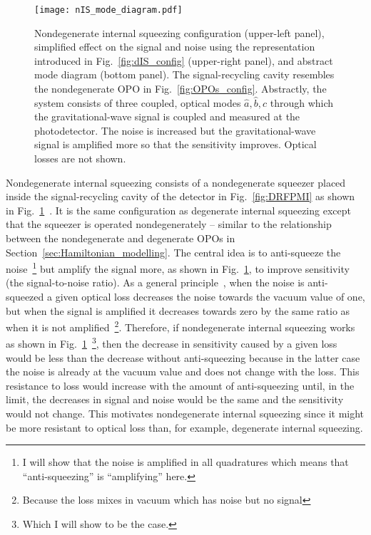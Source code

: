 \begin{figure}[htp]
    \centering
    \texttt{[image: nIS\_mode\_diagram.pdf]}
    \caption{Nondegenerate internal squeezing configuration (upper-left panel), simplified effect on the signal and noise using the representation introduced in Fig.~\ref{fig:dIS_config} (upper-right panel), and abstract mode diagram (bottom panel). The signal-recycling cavity resembles the nondegenerate OPO in Fig.~\ref{fig:OPOs_config}. Abstractly, the system consists of three coupled, optical modes $\hat a,\hat b,\hat c$ through which the gravitational-wave signal is coupled and measured at the photodetector. The noise is increased but the gravitational-wave signal is amplified more so that the sensitivity improves. Optical losses are not shown.}
    \label{fig:nIS_mode_diagram}
\end{figure}

Nondegenerate internal squeezing consists of a nondegenerate squeezer placed inside the signal-recycling cavity of the detector in Fig.~\ref{fig:DRFPMI} as shown in Fig.~\ref{fig:nIS_mode_diagram}~\cite{liBroadbandSensitivityImprovement2020}. It is the same configuration as degenerate internal squeezing except that the squeezer is operated nondegenerately -- similar to the relationship between the nondegenerate and degenerate OPOs in Section~\ref{sec:Hamiltonian_modelling}. The central idea is to anti-squeeze the noise~\footnote{I will show that the noise is amplified in all quadratures which means that ``anti-squeezing'' is ``amplifying'' here.} but amplify the signal more, as shown in Fig.~\ref{fig:nIS_mode_diagram}, to improve sensitivity (the signal-to-noise ratio).
As a general principle~\cite{walls_1995}, when the noise is anti-squeezed a given optical loss decreases the noise towards the vacuum value of one, but when the signal is amplified it decreases towards zero by the same ratio as when it is not amplified~\footnote{Because the loss mixes in vacuum which has noise but no signal}. Therefore, if nondegenerate internal squeezing works as shown in Fig.~\ref{fig:nIS_mode_diagram}~\footnote{Which I will show to be the case.}, then the decrease in sensitivity caused by a given loss would be less than the decrease without anti-squeezing because in the latter case the noise is already at the vacuum value and does not change with the loss. This resistance to loss would increase with the amount of anti-squeezing until, in the limit, the decreases in signal and noise would be the same and the sensitivity would not change. %
This motivates nondegenerate internal squeezing since it might be more resistant to optical loss than, for example, degenerate internal squeezing. %

